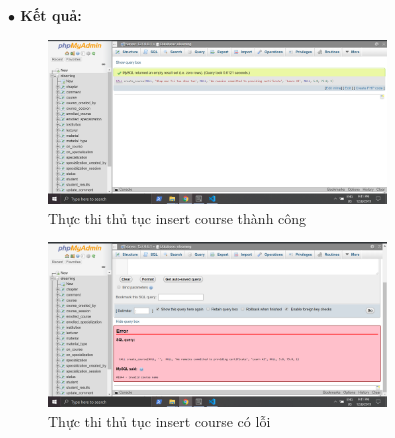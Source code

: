 \documentclass[12pt,a4paper,titlepage]{article}
\begin{document}
\textbf{$\bullet$ Kết quả:}
\newpage
\begin{figure}[h!]
	\centering
	\caption{Thực thi thủ tục insert course thành công}
	\includegraphics[width=0.8\textwidth]{images/p1s.png}
\end{figure}
\begin{figure}[h!]
	\centering
	\caption{Thực thi thủ tục insert course có lỗi}
	\includegraphics[width=0.8\textwidth]{images/p1e.png}
\end{figure}
\end{document}
